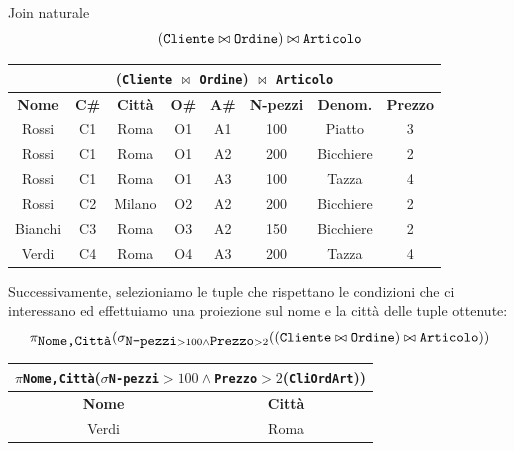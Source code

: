 \begin{Example}{Join naturale}{}
\begin{equation*}
        (\verb|Cliente| \bowtie \verb|Ordine|) \bowtie \verb|Articolo|
    \end{equation*}
    \begin{center}
        \begin{tabular}{|c|c|c|c|c|c|c|c|}
            \hline\multicolumn{8}{|c|}{(\Verb|Cliente| $\bowtie$ \Verb|Ordine|) $\bowtie$ \Verb|Articolo|}\\\hline
            \textbf{Nome} & \textbf{C\#} & \textbf{Città} & \textbf{O\#} & \textbf{A\#} & \textbf{N-pezzi} & \textbf{Denom.} & \textbf{Prezzo}\\\hline
            Rossi & C1 & Roma & O1 & A1 & 100 & Piatto & 3\\
            Rossi & C1 & Roma & O1 & A2 & 200 & Bicchiere & 2\\
            Rossi & C1 & Roma & O1 & A3 & 100 & Tazza & 4\\
            Rossi & C2 & Milano & O2 & A2 & 200 & Bicchiere & 2\\
            Bianchi & C3 & Roma & O3 & A2 & 150 & Bicchiere & 2\\
            Verdi & C4 & Roma & O4 & A3 & 200 & Tazza & 4\\\hline
        \end{tabular}
    \end{center}
    Successivamente, selezioniamo le tuple che rispettano le condizioni che ci interessano ed effettuiamo una proiezione sul nome e la città delle tuple ottenute:
    \begin{equation*}
        \pi_{\verb|Nome,Città|}(\sigma_{\verb|N-pezzi|>100\land\verb|Prezzo|>2}((\verb|Cliente| \bowtie \verb|Ordine|) \bowtie \verb|Articolo|))
    \end{equation*}
    \begin{center}
        \begin{tabular}{|c|c|}
            \hline\multicolumn{2}{|c|}{$\pi$\scriptsize\Verb|Nome,Città|\normalsize($\sigma$\scriptsize\Verb|N-pezzi|$>100\land$\Verb|Prezzo|$>2$\normalsize(\Verb|CliOrdArt|))}\\\hline
            \textbf{Nome} & \textbf{Città}\\\hline
            Verdi & Roma\\\hline
        \end{tabular}
    \end{center}
\end{Example}

